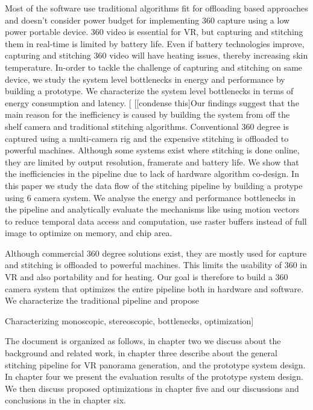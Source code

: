  Most of the software use traditional algorithms fit for offloading based approaches and doesn't consider power budget for implementing 360 capture using a low power portable device. 
360 video is essential for VR, but capturing and stitching them in real-time is limited by battery life. Even if battery technologies improve, capturing and stitching 360 video will have heating issues, thereby increasing skin temperature. In-order to tackle the challenge of capturing and stitching on same device, we study the system level bottlenecks in energy and performance by building a prototype. We characterize the system level bottlenecks in terms of energy consumption and latency. [ [[condense this]Our findings suggest that the main reason for the inefficiency is caused by building the system from off the shelf camera and traditional stitching algorithms. Conventional 360 degree is captured using a multi-camera rig and the expensive stitching is offloaded to powerful machines. Although some systems exist where stitching is done online, they are limited by output resolution, framerate and battery life. We show that the inefficiencies in the pipeline due to lack of hardware algorithm co-design. In this paper we study the data flow of the stitching pipeline by building a protype using 6 camera system. We analyse the energy and performance bottlenecks in the pipeline and analytically evaluate the mechanisms like using motion vectors to reduce temporal data access and computation, use raster buffers instead of full image to optimize on memory, and chip area. 
 
 Although commercial 360 degree solutions exist, they are mostly used for capture and stitching is offloaded to powerful machines. This limits the usability of 360 in VR and also portability and for heating. Our goal is therefore to build a 360 camera system that optimizes the entire pipeline both in hardware and software. We characterize the traditional pipeline and propose

Characterizing monoscopic, stereoscopic, bottlenecks, optimization]

The document is organized as follows, in chapter two we discuss about the background and related work, in chapter three describe about the general stitching pipeline for VR panorama generation, and the prototype system design. In chapter four we present the evaluation results of the prototype system design. We then discuss proposed optimizations in chapter five and our discussions and conclusions in the  in chapter six.

